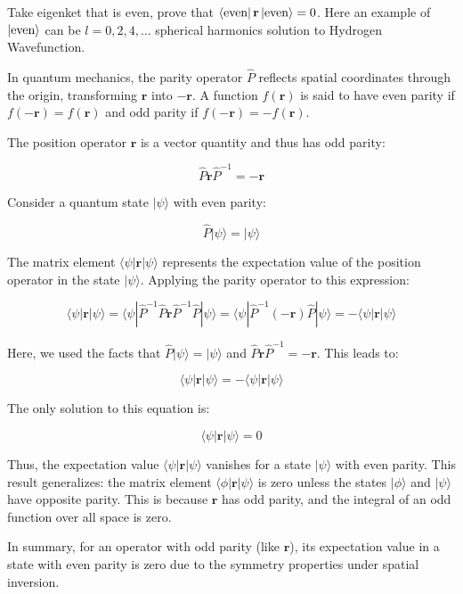 \documentclass[10pt]{article}
\renewcommand{\vec}{\mathbf}
\begin{document}
\begin{prob}
	Take eigenket that is even, prove that $\bra{\text{even}}  \vec{r}  \ket{\text{even}} = 0$. Here an example of $\ket{\text{even}}$ can be $l = 0, 2, 4, \ldots$ spherical harmonics solution to Hydrogen Wavefunction.
\end{prob}
\begin{solu}
	\begin{small}
		In quantum mechanics, the parity operator \( \hat{P} \) reflects spatial coordinates through the origin, transforming \( \mathbf{r} \) into \( -\mathbf{r} \). A function \( f(\mathbf{r}) \) is said to have even parity if \( f(-\mathbf{r}) = f(\mathbf{r}) \) and odd parity if \( f(-\mathbf{r}) = -f(\mathbf{r}) \).

The position operator \( \mathbf{r} \) is a vector quantity and thus has odd parity:

\[ \hat{P} \mathbf{r} \hat{P}^{-1} = -\mathbf{r} \]

Consider a quantum state \( | \psi \rangle \) with even parity:

\[ \hat{P} | \psi \rangle = | \psi \rangle \]

The matrix element \( \langle \psi | \mathbf{r} | \psi \rangle \) represents the expectation value of the position operator in the state \( | \psi \rangle \). Applying the parity operator to this expression:

\[ \langle \psi | \mathbf{r} | \psi \rangle = \langle \psi | \hat{P}^{-1} \hat{P} \mathbf{r} \hat{P}^{-1} \hat{P} | \psi \rangle = \langle \psi | \hat{P}^{-1} (-\mathbf{r}) \hat{P} | \psi \rangle = -\langle \psi | \mathbf{r} | \psi \rangle \]

Here, we used the facts that \( \hat{P} | \psi \rangle = | \psi \rangle \) and \( \hat{P} \mathbf{r} \hat{P}^{-1} = -\mathbf{r} \). This leads to:

\[ \langle \psi | \mathbf{r} | \psi \rangle = -\langle \psi | \mathbf{r} | \psi \rangle \]

The only solution to this equation is:

\[ \langle \psi | \mathbf{r} | \psi \rangle = 0 \]

Thus, the expectation value \( \langle \psi | \mathbf{r} | \psi \rangle \) vanishes for a state \( | \psi \rangle \) with even parity. This result generalizes: the matrix element \( \langle \phi | \mathbf{r} | \psi \rangle \) is zero unless the states \( | \phi \rangle \) and \( | \psi \rangle \) have opposite parity. This is because \( \mathbf{r} \) has odd parity, and the integral of an odd function over all space is zero.

In summary, for an operator with odd parity (like \( \mathbf{r} \)), its expectation value in a state with even parity is zero due to the symmetry properties under spatial inversion. 
	\end{small}
\end{solu}
\end{document}
